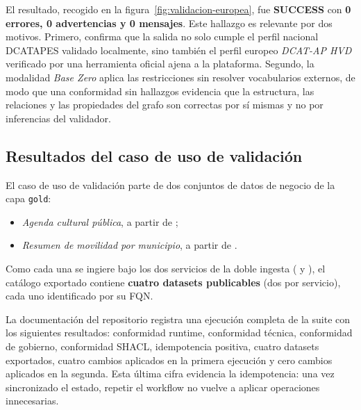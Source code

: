 El resultado, recogido en la figura~\ref{fig:validacion-europea}, fue \textbf{SUCCESS} con \textbf{0 errores, 0 advertencias y 0 mensajes}. Este hallazgo es relevante por dos motivos. Primero, confirma que la salida no solo cumple el perfil nacional \ac{DCATAPES} validado localmente, sino también el perfil europeo \emph{DCAT-AP HVD} verificado por una herramienta oficial ajena a la plataforma. Segundo, la modalidad \emph{Base Zero} aplica las restricciones sin resolver vocabularios externos, de modo que una conformidad sin hallazgos evidencia que la estructura, las relaciones y las propiedades del grafo son correctas por sí mismas y no por inferencias del validador.


\subsection{Resultados del caso de uso de validación}

El caso de uso de validación parte de dos conjuntos de datos de negocio de la capa \texttt{gold}:

\begin{itemize}
  \item \emph{Agenda cultural pública}, a partir de ;
  \item \emph{Resumen de movilidad por municipio}, a partir de .
\end{itemize}

Como cada una se ingiere bajo los dos servicios de la doble ingesta ( y ), el catálogo exportado contiene \textbf{cuatro datasets publicables} (dos por servicio), cada uno identificado por su \ac{FQN}.

La documentación del repositorio registra una ejecución completa de la suite con los siguientes resultados: conformidad runtime, conformidad técnica, conformidad de gobierno, conformidad SHACL, idempotencia positiva, cuatro datasets exportados, cuatro cambios aplicados en la primera ejecución y cero cambios aplicados en la segunda. Esta última cifra evidencia la idempotencia: una vez sincronizado el estado, repetir el workflow no vuelve a aplicar operaciones innecesarias.

